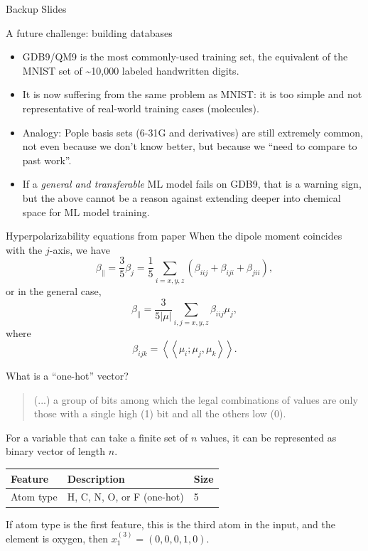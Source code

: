 \documentclass[xetex,compress]{beamer}
\begin{document}
\begin{frame}{Backup Slides}
\end{frame}

\begin{frame}{A future challenge: building databases}
  \begin{itemize}
  \item GDB9/QM9 is the most commonly-used training set, the equivalent of the MNIST set of \textasciitilde{}10,000 labeled handwritten digits.
  \item It is now suffering from the same problem as MNIST: it is too simple and not representative of real-world training cases (molecules).
  \item Analogy: Pople basis sets (6-31G and derivatives) are still extremely common, not even because we don't know better, but because we ``need to compare to past work''.
  \item If a \emph{general and transferable} ML model fails on GDB9, that is a warning sign, but the above cannot be a reason against extending deeper into chemical space for ML model training.
  \end{itemize}
\end{frame}

\begin{frame}{Hyperpolarizability equations from paper}
  When the dipole moment coincides with the \(j\)-axis, we have
  \begin{equation}
    \beta_{\parallel} = \frac{3}{5}\beta_j = \frac{1}{5} \sum_{i=x,y,z} (\beta_{iij} + \beta_{iji} + \beta_{jii}),
  \end{equation}
  or in the general case,
  \begin{equation}
    \beta_{\parallel} = \frac{3}{5|\mu|} \sum_{i,j=x,y,z} \beta_{iij} \mu_{j},
  \end{equation}
  where
  \begin{equation}
    \beta_{ijk} = \left<\left<\mu_{i};\mu_{j},\mu_{k}\right>\right>.
  \end{equation}
\end{frame}

\begin{frame}{What is a ``one-hot'' vector?}
  \begin{quote}
    (...) a group of bits among which the legal combinations of values are only those with a single high (1) bit and all the others low (0).
  \end{quote}
  For a variable that can take a finite set of \(n\) values, it can be represented as binary vector of length \(n\).
  \begin{table}[htbp]
    \centering
    \begin{tabular}{@{}lll@{}}
      \toprule
      Feature & Description & Size \\ \midrule
      Atom type & H, C, N, O, or F (one-hot) & 5 \\ \bottomrule
    \end{tabular}
  \end{table}
  If atom type is the first feature, this is the third atom in the input, and the element is oxygen, then \(x_{1}^{(3)} = (0, 0, 0, 1, 0)\).
\end{frame}
\end{document}
